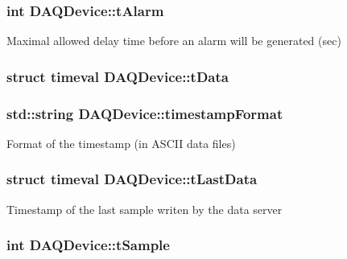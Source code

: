 \hypertarget{classDAQDevice_a508ad6a95eec7efc47047b056f145a9d}{
\subsubsection[{t\-Alarm}]{\setlength{\rightskip}{0pt plus 5cm}int D\-A\-Q\-Device\-::t\-Alarm\hspace{0.3cm}{\ttfamily [protected]}}}\label{classDAQDevice_a508ad6a95eec7efc47047b056f145a9d}
Maximal allowed delay time before an alarm will be generated (sec) \hypertarget{classDAQDevice_af7da14a199a793fd63db3af2b2a78d92}{
\subsubsection[{t\-Data}]{\setlength{\rightskip}{0pt plus 5cm}struct timeval D\-A\-Q\-Device\-::t\-Data\hspace{0.3cm}{\ttfamily [protected]}}}\label{classDAQDevice_af7da14a199a793fd63db3af2b2a78d92}
\hypertarget{classDAQDevice_a35f89e6ada8acd69ce9b705633370345}{
\subsubsection[{timestamp\-Format}]{\setlength{\rightskip}{0pt plus 5cm}std\-::string D\-A\-Q\-Device\-::timestamp\-Format\hspace{0.3cm}{\ttfamily [protected]}}}\label{classDAQDevice_a35f89e6ada8acd69ce9b705633370345}
Format of the timestamp (in A\-S\-C\-I\-I data files) \hypertarget{classDAQDevice_a7c0d73d39b13231c2760b0aa6724b42c}{
\subsubsection[{t\-Last\-Data}]{\setlength{\rightskip}{0pt plus 5cm}struct timeval D\-A\-Q\-Device\-::t\-Last\-Data\hspace{0.3cm}{\ttfamily [protected]}}}\label{classDAQDevice_a7c0d73d39b13231c2760b0aa6724b42c}
Timestamp of the last sample writen by the data server \hypertarget{classDAQDevice_aae80d100e6407da492b7bda911739bb8}{
\subsubsection[{t\-Sample}]{\setlength{\rightskip}{0pt plus 5cm}int D\-A\-Q\-Device\-::t\-Sample\hspace{0.3cm}{\ttfamily [protected]}}}\label{classDAQDevice_aae80d100e6407da492b7bda911739bb8}
